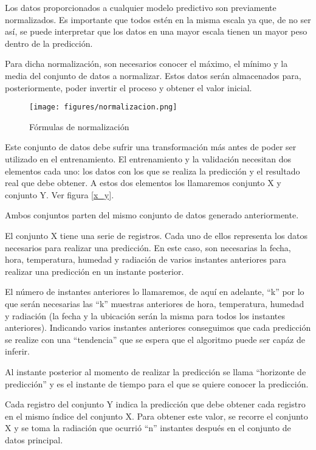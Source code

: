 Los datos proporcionados a cualquier modelo predictivo son previamente normalizados. Es importante que todos estén en la misma escala ya que, de no ser así, se puede interpretar que los datos en una mayor escala tienen un mayor peso dentro de la predicción.

Para dicha normalización, son necesarios conocer el máximo, el mínimo y la media del conjunto de datos a normalizar. Estos datos serán almacenados para, posteriormente, poder invertir el proceso y obtener el valor inicial.

\begin{figure}[htb]
	\begin{center}
		\texttt{[image: figures/normalizacion.png]}
		\caption{Fórmulas de normalización \label{normalizacion}}
	\end{center}
\end{figure}

Este conjunto de datos debe sufrir una transformación más antes de poder ser utilizado en el entrenamiento. El entrenamiento y la validación necesitan dos elementos cada uno: los datos con los que se realiza la predicción y el resultado real que debe obtener. A estos dos elementos los llamaremos conjunto X y conjunto Y. Ver figura \ref{x_y}.

Ambos conjuntos parten del mismo conjunto de datos generado anteriormente.

El conjunto X tiene una serie de registros. Cada uno de ellos representa los datos necesarios para realizar una predicción. En este caso, son necesarias la fecha, hora, temperatura, humedad y radiación de varios instantes anteriores para realizar una predicción en un instante posterior.

El número de instantes anteriores lo llamaremos, de aquí en adelante, ``k'' por lo que serán necesarias las ``k'' muestras anteriores de hora, temperatura, humedad y radiación (la fecha y la ubicación serán la misma para todos los instantes anteriores). Indicando varios instantes anteriores conseguimos que cada predicción se realize con una ``tendencia'' que se espera que el algoritmo puede ser capáz de inferir.

Al instante posterior al momento de realizar la predicción se llama ``horizonte de predicción'' y es el instante de tiempo para el que se quiere conocer la predicción.

Cada registro del conjunto Y indica la predicción que debe obtener cada registro en el mismo índice del conjunto X. Para obtener este valor, se recorre el conjunto X y se toma la radiación que ocurrió ``n'' instantes después en el conjunto de datos principal.

